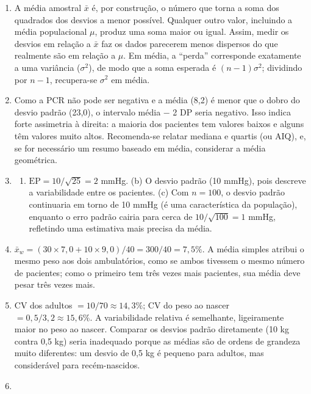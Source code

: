\documentclass[
]{book}
\providecommand{\tightlist}{%
  \setlength{\itemsep}{0pt}\setlength{\parskip}{0pt}}
\begin{document}
\begin{enumerate}
\begin{verbatim}
## [1] 45
\end{verbatim}
\item
  A média amostral \(\bar{x}\) é, por construção, o número que torna a soma dos quadrados dos desvios a menor possível. Qualquer outro valor, incluindo a média populacional \(\mu\), produz uma soma maior ou igual. Assim, medir os desvios em relação a \(\bar{x}\) faz os dados parecerem menos dispersos do que realmente são em relação a \(\mu\). Em média, a ``perda'' corresponde exatamente a uma variância (\(\sigma^2\)), de modo que a soma esperada é \((n-1)\sigma^2\); dividindo por \(n - 1\), recupera-se \(\sigma^2\) em média.
\item
  Como a PCR não pode ser negativa e a média (8,2) é menor que o dobro do desvio padrão (23,0), o intervalo média − 2 DP seria negativo. Isso indica forte assimetria à direita: a maioria dos pacientes tem valores baixos e alguns têm valores muito altos. Recomenda-se relatar mediana e quartis (ou AIQ), e, se for necessário um resumo baseado em média, considerar a média geométrica.
\item
  \begin{enumerate}
  \def\labelenumii{(\alph{enumii})}
  \tightlist
  \item
    \(\text{EP} = 10/\sqrt{25} = 2\) mmHg. (b) O desvio padrão (10 mmHg), pois descreve a variabilidade entre os pacientes. (c) Com \(n = 100\), o desvio padrão continuaria em torno de 10 mmHg (é uma característica da população), enquanto o erro padrão cairia para cerca de \(10/\sqrt{100} = 1\) mmHg, refletindo uma estimativa mais precisa da média.
  \end{enumerate}
\item
  \(\bar{x}_w = (30 \times 7{,}0 + 10 \times 9{,}0)/40 = 300/40 = 7{,}5\%\). A média simples atribui o mesmo peso aos dois ambulatórios, como se ambos tivessem o mesmo número de pacientes; como o primeiro tem três vezes mais pacientes, sua média deve pesar três vezes mais.
\item
  CV dos adultos \(= 10/70 \approx 14{,}3\%\); CV do peso ao nascer \(= 0{,}5/3{,}2 \approx 15{,}6\%\). A variabilidade relativa é semelhante, ligeiramente maior no peso ao nascer. Comparar os desvios padrão diretamente (10 kg contra 0,5 kg) seria inadequado porque as médias são de ordens de grandeza muito diferentes: um desvio de 0,5 kg é pequeno para adultos, mas considerável para recém-nascidos.
\item
  \begin{enumerate}

\end{enumerate}
\end{enumerate}
\end{document}
